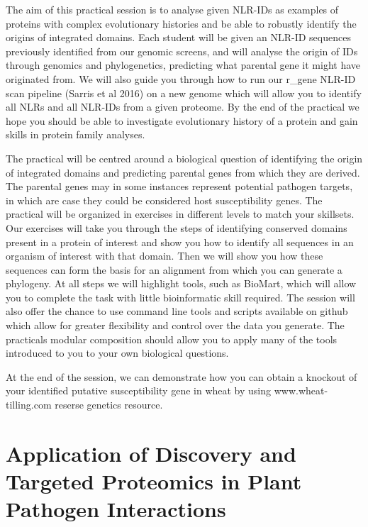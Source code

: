 \documentclass[12pt,]{book}
\theoremstyle{definition}
\theoremstyle{definition}
\theoremstyle{remark}
\begin{document}
The aim of this practical session is to analyse given NLR-IDs as
examples of proteins with complex evolutionary histories and be able to
robustly identify the origins of integrated domains. Each student will
be given an NLR-ID sequences previously identified from our genomic
screens, and will analyse the origin of IDs through genomics and
phylogenetics, predicting what parental gene it might have originated
from. We will also guide you through how to run our r\_gene NLR-ID scan
pipeline (Sarris et al 2016) on a new genome which will allow you to
identify all NLRs and all NLR-IDs from a given proteome. By the end of
the practical we hope you should be able to investigate evolutionary
history of a protein and gain skills in protein family analyses.

The practical will be centred around a biological question of
identifying the origin of integrated domains and predicting parental
genes from which they are derived. The parental genes may in some
instances represent potential pathogen targets, in which are case they
could be considered host susceptibility genes. The practical will be
organized in exercises in different levels to match your skillsets. Our
exercises will take you through the steps of identifying conserved
domains present in a protein of interest and show you how to identify
all sequences in an organism of interest with that domain. Then we will
show you how these sequences can form the basis for an alignment from
which you can generate a phylogeny. At all steps we will highlight
tools, such as BioMart, which will allow you to complete the task with
little bioinformatic skill required. The session will also offer the
chance to use command line tools and scripts available on github which
allow for greater flexibility and control over the data you generate.
The practicals modular composition should allow you to apply many of the
tools introduced to you to your own biological questions.

At the end of the session, we can demonstrate how you can obtain a
knockout of your identified putative susceptibility gene in wheat by
using www.wheat-tilling.com reserse genetics resource.

\chapter*{Application of Discovery and Targeted Proteomics in Plant
Pathogen
Interactions}\label{application-of-discovery-and-targeted-proteomics-in-plant-pathogen-interactions}
\end{document}
